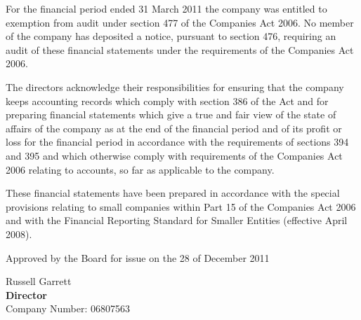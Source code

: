 {\footnotesize For the financial period ended 31 March 2011 the
company was entitled to exemption from audit under section 477 of the
Companies Act 2006. No member of the company has deposited a
notice, pursuant to section 476, requiring an audit of these
financial statements under the requirements of the Companies Act
2006.

The directors acknowledge their responsibilities for ensuring that
the company keeps accounting records which comply with section 386
of the Act and for preparing financial statements which give a true
and fair view of the state of affairs of the company as at the end
of the financial period and of its profit or loss for the financial
period in accordance with the requirements of sections 394 and 395
and which otherwise comply with requirements of the Companies Act
2006 relating to accounts, so far as applicable to the company.

These financial statements have been prepared in accordance with
the special provisions relating to small companies within Part 15
of the Companies Act 2006 and with the Financial Reporting Standard
for Smaller Entities (effective April 2008).}

\vfill

Approved by the Board for issue on the 28 of December 2011
\vspace{48pt}

Russell Garrett \\
{\bf Director} \\
Company Number: 06807563
